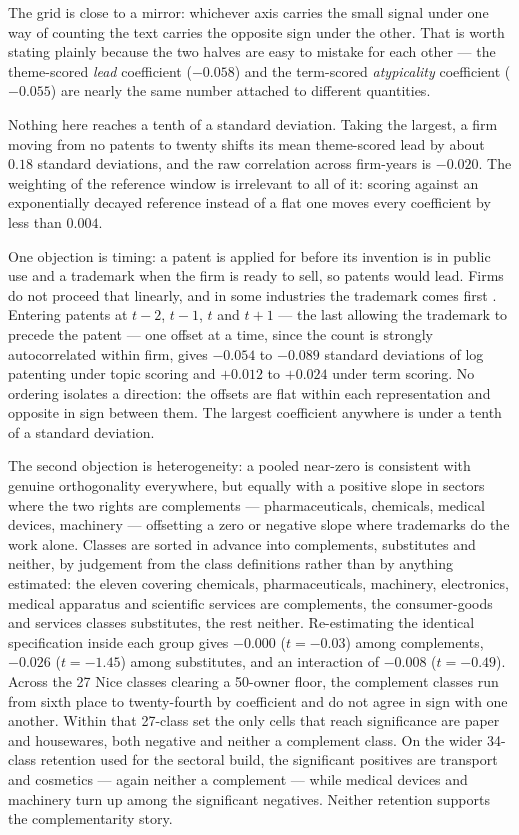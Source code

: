 \documentclass[11pt]{article}
\begin{document}
\noindent The grid is close to a mirror: whichever axis carries the small
signal under one way of counting the text carries the opposite sign under the
other. That is worth stating plainly because the two halves are easy to
mistake for each other --- the theme-scored \emph{lead} coefficient
($-0.058$) and the term-scored \emph{atypicality} coefficient ($-0.055$) are
nearly the same number attached to different quantities.

Nothing here reaches a tenth of a standard deviation. Taking the largest, a
firm moving from no patents to twenty shifts its mean theme-scored lead by
about $0.18$ standard deviations, and the raw correlation across firm-years is
$-0.020$. The weighting of the reference window is irrelevant to all of it:
scoring against an exponentially decayed reference instead of a flat one moves
every coefficient by less than $0.004$.

One objection is timing: a patent is applied for before its invention is in public use and a trademark when the firm is ready
to sell, so patents would lead. Firms do not proceed that linearly, and in
some industries the trademark comes first \citep{Seip2018}. Entering patents
at $t-2$, $t-1$, $t$ and $t+1$ --- the last allowing the trademark to
precede the patent --- one offset at a time, since the count is strongly
autocorrelated within firm, gives $-0.054$ to $-0.089$ standard deviations of log patenting under topic
scoring and $+0.012$ to $+0.024$ under term scoring. No ordering isolates a
direction: the offsets are flat within each representation and opposite in
sign between them. The largest coefficient anywhere is under a tenth of a
standard deviation.

The second objection is heterogeneity: a pooled near-zero is consistent
with genuine orthogonality everywhere, but equally with a positive slope
in sectors where the two rights are complements --- pharmaceuticals,
chemicals, medical devices, machinery --- offsetting a zero or negative
slope where trademarks do the work alone. Classes are sorted in advance into complements, substitutes and neither, by
judgement from the class definitions rather than by anything estimated: the
eleven covering chemicals, pharmaceuticals, machinery, electronics, medical
apparatus and scientific services are complements, the consumer-goods and
services classes substitutes, the rest neither. Re-estimating the identical
specification inside each group gives $-0.000$
($t = -0.03$) among complements, $-0.026$ ($t = -1.45$) among substitutes,
and an interaction of $-0.008$ ($t = -0.49$). Across the 27 Nice classes
clearing a 50-owner floor, the complement classes run from sixth place to
twenty-fourth by coefficient and do not agree in sign with one another. Within that 27-class set the only cells that reach significance are paper and
housewares, both negative and neither a complement class. On the wider
34-class retention used for the sectoral build, the significant positives are
transport and cosmetics --- again neither a complement --- while medical
devices and machinery turn up among the significant negatives. Neither
retention supports the complementarity story.
\end{document}
